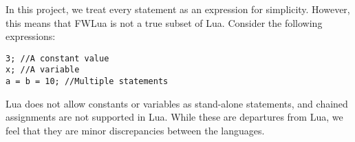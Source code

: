 




In this project, we treat every statement as an expression for simplicity.
However, this means that FWLua is not a true subset of Lua.
Consider the following expressions:

\begin{flushleft}
\tt 3;   //A constant value\\
\tt x;   //A variable\\
\tt a = b = 10;   //Multiple statements\\
\end{flushleft}

Lua does not allow constants or variables as stand-alone statements,
and chained assignments are not supported in Lua.
While these are departures from Lua, we feel that they are minor discrepancies between the languages.

